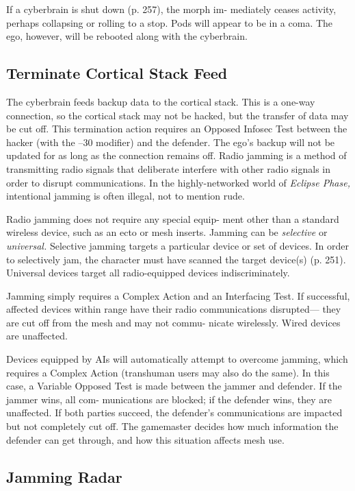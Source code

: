 If a cyberbrain is shut down (p. 257), the morph im-
mediately ceases activity, perhaps collapsing or rolling 
to a stop. Pods will appear to be in a coma. The ego, 
however, will be rebooted along with the cyberbrain.

\subsection{Terminate Cortical Stack Feed}

The cyberbrain feeds backup data to the cortical stack. 
This is a one-way connection, so the cortical stack may 
not be hacked, but the transfer of data may be cut off. 
This termination action requires an Opposed Infosec 
Test between the hacker (with the –30 modifier) and 
the defender. The ego's backup will not be updated for 
as long as the connection remains off.
Radio jamming is a method of transmitting radio 
signals that deliberate interfere with other radio 
signals in order to disrupt communications. In the 
highly-networked world of \textit{Eclipse Phase,} intentional 
jamming is often illegal, not to mention rude.

Radio jamming does not require any special equip-
ment other than a standard wireless device, such as 
an ecto or mesh inserts. Jamming can be \textit{selective }
or \textit{universal.} Selective jamming targets a particular 
device or set of devices. In order to selectively jam, 
the character must have scanned the target device(s) 
(p. 251). Universal devices target all radio-equipped 
devices indiscriminately.

Jamming simply requires a Complex Action and an 
Interfacing Test. If successful, affected devices within 
range have their radio communications disrupted—
they are cut off from the mesh and may not commu-
nicate wirelessly. Wired devices are unaffected.

Devices equipped by AIs will automatically attempt 
to overcome jamming, which requires a Complex 
Action (transhuman users may also do the same). In 
this case, a Variable Opposed Test is made between 
the jammer and defender. If the jammer wins, all com-
munications are blocked; if the defender wins, they 
are unaffected. If both parties succeed, the defender's 
communications are impacted but not completely cut 
off. The gamemaster decides how much information 
the defender can get through, and how this situation 
affects mesh use.

\subsection{Jamming Radar}

